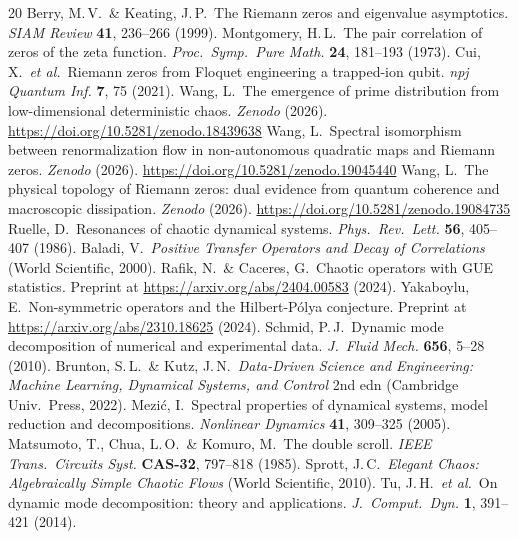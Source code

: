 \documentclass[11pt]{article}
\begin{document}
\begin{thebibliography}{20}
 Berry, M.\,V.\ \& Keating, J.\,P.\ The Riemann zeros and eigenvalue asymptotics. \emph{SIAM Review} \textbf{41}, 236--266 (1999).
 Montgomery, H.\,L.\ The pair correlation of zeros of the zeta function. \emph{Proc.\ Symp.\ Pure Math.} \textbf{24}, 181--193 (1973).
 Cui, X.\ \emph{et al.}\ Riemann zeros from Floquet engineering a trapped-ion qubit. \emph{npj Quantum Inf.} \textbf{7}, 75 (2021).
 Wang, L.\ The emergence of prime distribution from low-dimensional deterministic chaos. \emph{Zenodo} (2026). \url{https://doi.org/10.5281/zenodo.18439638}
 Wang, L.\ Spectral isomorphism between renormalization flow in non-autonomous quadratic maps and Riemann zeros. \emph{Zenodo} (2026). \url{https://doi.org/10.5281/zenodo.19045440}
 Wang, L.\ The physical topology of Riemann zeros: dual evidence from quantum coherence and macroscopic dissipation. \emph{Zenodo} (2026). \url{https://doi.org/10.5281/zenodo.19084735}
 Ruelle, D.\ Resonances of chaotic dynamical systems. \emph{Phys.\ Rev.\ Lett.} \textbf{56}, 405--407 (1986).
 Baladi, V.\ \emph{Positive Transfer Operators and Decay of Correlations} (World Scientific, 2000).
 Rafik, N.\ \& Caceres, G.\ Chaotic operators with GUE statistics. Preprint at \url{https://arxiv.org/abs/2404.00583} (2024).
 Yakaboylu, E.\ Non-symmetric operators and the Hilbert-P\'olya conjecture. Preprint at \url{https://arxiv.org/abs/2310.18625} (2024).
 Schmid, P.\,J.\ Dynamic mode decomposition of numerical and experimental data. \emph{J.\ Fluid Mech.} \textbf{656}, 5--28 (2010).
 Brunton, S.\,L.\ \& Kutz, J.\,N.\ \emph{Data-Driven Science and Engineering: Machine Learning, Dynamical Systems, and Control} 2nd edn (Cambridge Univ.\ Press, 2022).
 Mezi\'c, I.\ Spectral properties of dynamical systems, model reduction and decompositions. \emph{Nonlinear Dynamics} \textbf{41}, 309--325 (2005).
 Matsumoto, T., Chua, L.\,O.\ \& Komuro, M.\ The double scroll. \emph{IEEE Trans.\ Circuits Syst.} \textbf{CAS-32}, 797--818 (1985).
 Sprott, J.\,C.\ \emph{Elegant Chaos: Algebraically Simple Chaotic Flows} (World Scientific, 2010).
 Tu, J.\,H.\ \emph{et al.}\ On dynamic mode decomposition: theory and applications. \emph{J.\ Comput.\ Dyn.} \textbf{1}, 391--421 (2014).
\end{thebibliography}
\end{document}
